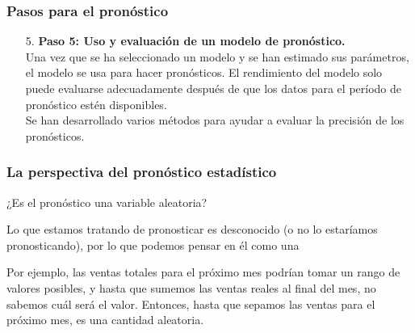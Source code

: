 \documentclass[10pt]{beamer}
\begin{document}





\begin{frame}
\frametitle{Pasos para el pronóstico}


\begin{enumerate}
\item[5.] \textbf{Paso 5: Uso y evaluación de un modelo de pronóstico.}  \\
Una vez que se ha seleccionado un modelo y se han estimado sus parámetros, el modelo se usa para hacer pronósticos. El rendimiento del modelo solo puede evaluarse adecuadamente después de que los datos para el período de pronóstico estén disponibles.\\
\vspace{3mm}
Se han desarrollado varios métodos para ayudar a evaluar la precisión de los pronósticos.
\end{enumerate}

\end{frame}





\begin{frame}
\frametitle{La perspectiva del pronóstico estadístico}


\begin{center}
¿Es el pronóstico una variable aleatoria?
\end{center}

\pause
\vspace{3mm}

Lo que estamos tratando de pronosticar es desconocido (o no lo estaríamos pronosticando), por lo que podemos pensar en él como una 

\vspace{3mm}

Por ejemplo, las ventas totales para el próximo mes podrían tomar un rango de valores posibles, y hasta que sumemos las ventas reales al final del mes, no sabemos cuál será el valor. Entonces, hasta que sepamos las ventas para el próximo mes, es una cantidad aleatoria.


\end{frame}


\end{document}
